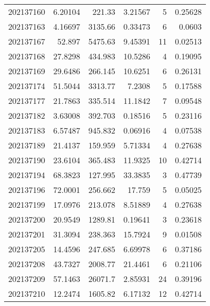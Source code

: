 \begin{tabular}{rrrrrr}
 202137160 &          6.20104 &      221.33   &            3.21567 &           5 & 0.25628 \\
 202137163 &          4.16697 &     3135.66   &            0.33473 &           6 & 0.0603  \\
 202137167 &         52.897   &     5475.63   &            9.45391 &          11 & 0.02513 \\
 202137168 &         27.8298  &      434.983  &           10.5286  &           4 & 0.19095 \\
 202137169 &         29.6486  &      266.145  &           10.6251  &           6 & 0.26131 \\
 202137174 &         51.5044  &     3313.77   &            7.2308  &           5 & 0.17588 \\
 202137177 &         21.7863  &      335.514  &           11.1842  &           7 & 0.09548 \\
 202137182 &          3.63008 &      392.703  &            0.18516 &           5 & 0.23116 \\
 202137183 &          6.57487 &      945.832  &            0.06916 &           4 & 0.07538 \\
 202137189 &         21.4137  &      159.959  &            5.71334 &           4 & 0.27638 \\
 202137190 &         23.6104  &      365.483  &           11.9325  &          10 & 0.42714 \\
 202137194 &         68.3823  &      127.995  &           33.3835  &           3 & 0.47739 \\
 202137196 &         72.0001  &      256.662  &           17.759   &           5 & 0.05025 \\
 202137199 &         17.0976  &      213.078  &            8.51889 &           4 & 0.27638 \\
 202137200 &         20.9549  &     1289.81   &            0.19641 &           3 & 0.23618 \\
 202137201 &         31.3094  &      238.363  &           15.7924  &           9 & 0.01508 \\
 202137205 &         14.4596  &      247.685  &            6.69978 &           6 & 0.37186 \\
 202137208 &         43.7327  &     2008.77   &           21.4461  &           6 & 0.21106 \\
 202137209 &         57.1463  &    26071.7    &            2.85931 &          24 & 0.39196 \\
 202137210 &         12.2474  &     1605.82   &            6.17132 &          12 & 0.42714 \\

\end{tabular}
